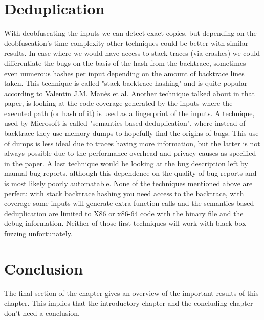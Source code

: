 \section{Deduplication}
\label{cha:3:Deduplication}
With deobfuscating the inputs we can detect exact copies, but depending on the deobfuscation's time complexity other techniques could be better with similar results. In case where we would have access to stack traces (via crashes) we could differentiate the bugs on the basis of the hash from the backtrace, sometimes even numerous hashes per input depending on the amount of backtrace lines taken. This technique is called "stack backtrace hashing" and is quite popular according to Valentin J.M. Man\`es et al. \cite{13manes2019survey} 
Another technique talked about in that paper, is looking at the code coverage generated by the inputs where the executed path (or hash of it) is used as a fingerprint of the inputs. A technique, used by Microsoft \cite{36semanticsAwareDeduplicationRETracer} is called "semantics based deduplication", where instead of backtrace they use memory dumps to hopefully find the origins of bugs. This use of dumps is less ideal due to traces having more information, but the latter is not always possible due to the performance overhead and privacy causes as specified in the paper. 
A last technique would be looking at the bug description left by manual bug reports, although this dependence on the quality of bug reports and is most likely poorly automatable. 
None of the techniques mentioned above are perfect: with stack backtrace hashing you need access to the backtrace, with coverage some inputs will generate extra function calls and the semantics based deduplication are limited to X86 or x86-64 code with the binary file and the debug information. Neither of those first techniques will work with black box fuzzing unfortunately.

\section{Conclusion}
\label{cha:3:Conclusion}
The final section of the chapter gives an overview of the important results
of this chapter. This implies that the introductory chapter and the
concluding chapter don't need a conclusion.


